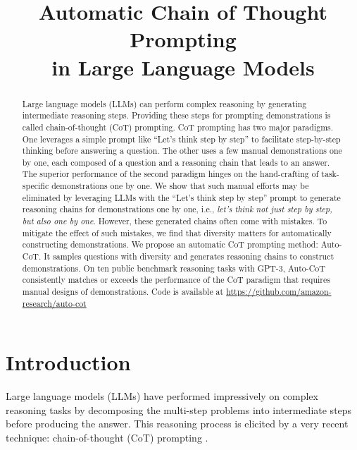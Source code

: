 \title{Automatic Chain of Thought Prompting \\ in Large Language Models}



\maketitle

\begin{abstract}

Large language models (LLMs) can perform complex reasoning by generating intermediate reasoning steps. Providing these steps for prompting demonstrations is called chain-of-thought (CoT) prompting. CoT prompting has two major paradigms. One leverages a simple prompt like ``Let’s think step by step'' to facilitate step-by-step thinking before answering a question. 
The other uses a few manual demonstrations one by one, each composed of a question and a reasoning chain that leads to an answer. 
The superior performance of the second paradigm hinges on the hand-crafting of task-specific demonstrations one by one. 
We show that such manual efforts may be eliminated by leveraging LLMs 
with the ``Let’s think step by step'' prompt
to generate reasoning chains for demonstrations one by one,
i.e., \emph{let's think not just step by step, but also one by one}. 
However, these generated chains often come with mistakes. To mitigate the effect of such mistakes, we find that diversity matters for automatically constructing demonstrations. We propose an automatic CoT prompting method: Auto-CoT. It samples questions with diversity and generates reasoning chains to construct demonstrations. On ten public benchmark reasoning tasks with GPT-3, Auto-CoT consistently matches or exceeds the performance of the CoT paradigm that requires manual designs of demonstrations. Code is available at \url{https://github.com/amazon-research/auto-cot}

\end{abstract}

\section{Introduction}

Large language models (LLMs) \citep{brown2020language, lamda, gopher, palm} have performed impressively on complex reasoning tasks by decomposing the multi-step problems into intermediate steps before producing the answer. This reasoning process is elicited by a very recent technique: chain-of-thought (CoT) prompting  \citep{cot_wei}. 

